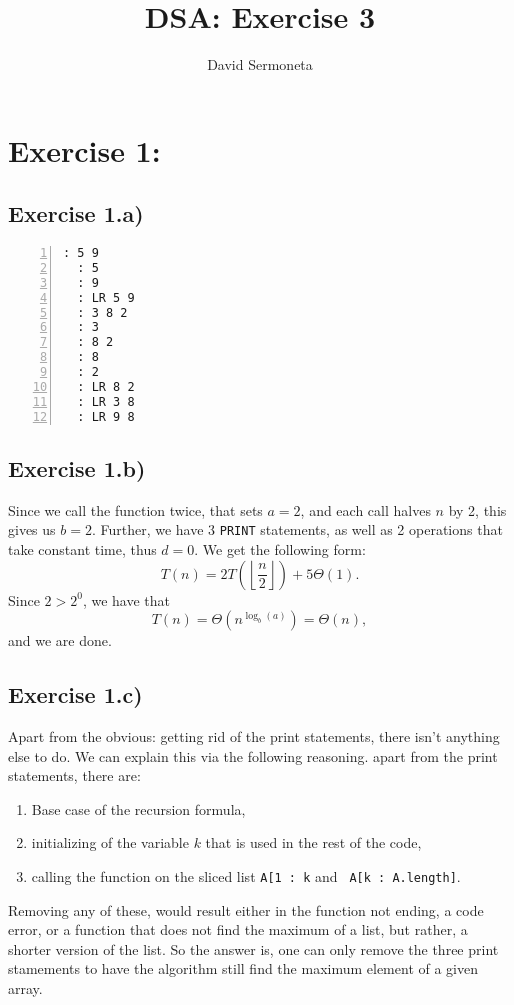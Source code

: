 \documentclass{article}
\title{DSA: Exercise 3}
\author{David Sermoneta}
\begin{document}
\maketitle
\section*{Exercise 1:}
\subsection*{Exercise 1.a)}
\begin{lstlisting}[numbers = left]
  : 5 9
  : 5
  : 9
  : LR 5 9
  : 3 8 2
  : 3
  : 8 2
  : 8
  : 2
  : LR 8 2
  : LR 3 8
  : LR 9 8 
\end{lstlisting}

\subsection*{Exercise 1.b)}
Since we call the function twice, that sets $a = 2$, and each call halves $n$ by 2,
this gives us $b=2$. Further, we have $3$ \texttt{PRINT} statements, as well
as 2 operations that take constant time, thus $d = 0$. We get the following form: \[
T(n) = 2T\left(\left\lfloor \frac{n}{2} \right\rfloor \right) + 5\Theta(1) .
\] Since $2 > 2^{0}$, we have that  \[
T(n) = \Theta(n^{\log_b(a)}) = \Theta(n),
\] and we are done.


\subsection*{Exercise 1.c)}
Apart from the obvious: getting rid of the print statements, there isn't anything
else to do. We can explain this via the following reasoning. apart from the 
print statements, there are: 
\begin{enumerate}
    \item Base case of the recursion formula,
    \item initializing of the variable $k$ that is used in the rest of the code,
    \item calling the function on the sliced list \texttt{A[1 : k} and  \texttt{
        A[k : A.length]}.
\end{enumerate}
Removing any of these, would result either in the function not 
ending, a code error, or a function that 
does not find the maximum of a list, but rather, a shorter version of the list.
So the answer is, one can only remove the three print stamements to have the
algorithm still find the maximum element of a given array.
\end{document}

